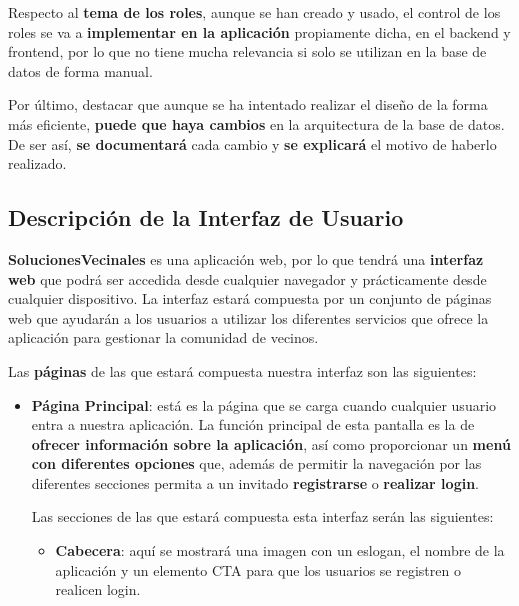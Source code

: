 Respecto al \textbf{tema de los roles}, aunque se han creado y usado, el control de los roles se va a \textbf{implementar en la aplicación} propiamente dicha, en el backend y frontend, por lo que no tiene mucha relevancia si solo se utilizan en la base de datos de forma manual.

Por último, destacar que aunque se ha intentado realizar el diseño de la forma más eficiente, \textbf{puede que haya cambios} en la arquitectura de la base de datos. De ser así, \textbf{se documentará} cada cambio y \textbf{se explicará }el motivo de haberlo  realizado. 


\newpage

\appendix

\begin{appendices}
	
\section{Descripción de la Interfaz de Usuario}
\label{sec:apenA}
\textbf{SolucionesVecinales} es una aplicación web, por lo que tendrá una \textbf{interfaz web} que podrá ser accedida desde cualquier navegador y prácticamente desde cualquier dispositivo. La interfaz estará compuesta por un conjunto de páginas web que ayudarán a los usuarios a utilizar los diferentes servicios que ofrece la aplicación para gestionar la comunidad de vecinos. 

Las \textbf{páginas} de las que estará compuesta nuestra interfaz son las siguientes:

\begin{itemize}
	\item \textbf{Página Principal}: está es la página que se carga cuando cualquier usuario entra a nuestra aplicación. La función principal de esta pantalla es la de \textbf{ofrecer información sobre la aplicación}, así como proporcionar un\textbf{ menú con diferentes opciones} que, además de permitir la navegación por las diferentes secciones permita a un invitado \textbf{registrarse} o \textbf{realizar \gls{login}}.
	
	Las secciones de las que estará compuesta esta interfaz serán las siguientes:
	
	\begin{itemize}
		\item \textbf{Cabecera}: aquí se mostrará una imagen con un eslogan, el nombre de la aplicación y un elemento \gls{CTA} para que los usuarios se registren o realicen login.
		

\end{itemize}
\end{itemize}
\end{appendices}
